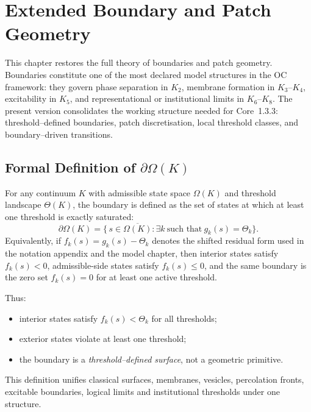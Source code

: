 
\section{Extended Boundary and Patch Geometry}
\label{sec:boundary-extended}

This chapter restores the full theory of boundaries and patch geometry.
Boundaries constitute one of the most declared model structures in the OC framework:
they govern phase separation in \(K_2\), membrane formation in \(K_3\)--\(K_4\),
excitability in \(K_5\), and representational or institutional limits in
\(K_6\)--\(K_8\).  
The present version consolidates the working structure needed for Core~1.3.3:
threshold–defined boundaries, patch discretisation, local threshold classes,
and boundary–driven transitions.

\subsection{Formal Definition of \texorpdfstring{$\partial\Omega(K)$}{boundary}}

For any continuum \(K\) with admissible state space \(\Omega(K)\) and threshold
landscape \(\Theta(K)\), the boundary is defined as the set of states at which
at least one threshold is exactly saturated:
\[
  \partial\Omega(K)
  =
  \big\{\, s \in \overline{\Omega(K)} :
          \exists k\ \text{such that}\ g_k(s) = \Theta_k \big\}.
\]
Equivalently, if \(f_k(s)=g_k(s)-\Theta_k\) denotes the shifted residual form
used in the notation appendix and the model chapter, then interior states
satisfy \(f_k(s)<0\), admissible-side states satisfy \(f_k(s)\le0\), and the
same boundary is the zero set \(f_k(s)=0\) for at least one active threshold.

Thus:
\begin{itemize}
    \item interior states satisfy \(f_k(s) < \Theta_k\) for all thresholds;
    \item exterior states violate at least one threshold;
    \item the boundary is a \emph{threshold–defined surface}, not a geometric
          primitive.
\end{itemize}

This definition unifies classical surfaces, membranes, vesicles,
percolation fronts, excitable boundaries, logical limits and institutional
thresholds under one structure.

